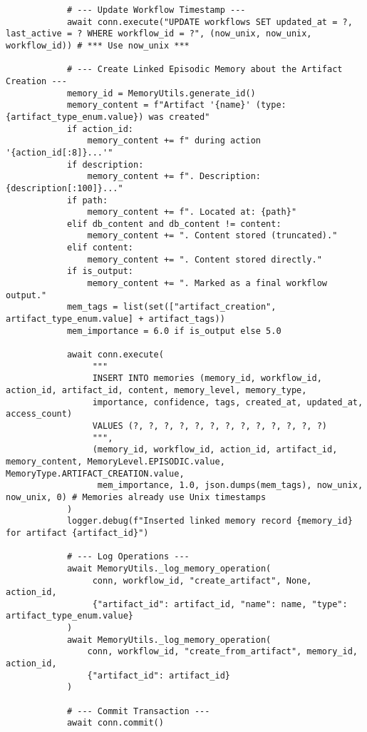 \documentclass[12pt,a4paper]{article}
\begin{document}
\begin{pageablecode}
\begin{verbatim}
            # --- Update Workflow Timestamp ---
            await conn.execute("UPDATE workflows SET updated_at = ?, last_active = ? WHERE workflow_id = ?", (now_unix, now_unix, workflow_id)) # *** Use now_unix ***

            # --- Create Linked Episodic Memory about the Artifact Creation ---
            memory_id = MemoryUtils.generate_id()
            memory_content = f"Artifact '{name}' (type: {artifact_type_enum.value}) was created"
            if action_id: 
                memory_content += f" during action '{action_id[:8]}...'"
            if description: 
                memory_content += f". Description: {description[:100]}..."
            if path: 
                memory_content += f". Located at: {path}"
            elif db_content and db_content != content: 
                memory_content += ". Content stored (truncated)."
            elif content: 
                memory_content += ". Content stored directly."
            if is_output: 
                memory_content += ". Marked as a final workflow output."
            mem_tags = list(set(["artifact_creation", artifact_type_enum.value] + artifact_tags))
            mem_importance = 6.0 if is_output else 5.0

            await conn.execute(
                 """
                 INSERT INTO memories (memory_id, workflow_id, action_id, artifact_id, content, memory_level, memory_type,
                 importance, confidence, tags, created_at, updated_at, access_count)
                 VALUES (?, ?, ?, ?, ?, ?, ?, ?, ?, ?, ?, ?, ?)
                 """,
                 (memory_id, workflow_id, action_id, artifact_id, memory_content, MemoryLevel.EPISODIC.value, MemoryType.ARTIFACT_CREATION.value,
                  mem_importance, 1.0, json.dumps(mem_tags), now_unix, now_unix, 0) # Memories already use Unix timestamps
            )
            logger.debug(f"Inserted linked memory record {memory_id} for artifact {artifact_id}")

            # --- Log Operations ---
            await MemoryUtils._log_memory_operation(
                 conn, workflow_id, "create_artifact", None, action_id,
                 {"artifact_id": artifact_id, "name": name, "type": artifact_type_enum.value}
            )
            await MemoryUtils._log_memory_operation(
                conn, workflow_id, "create_from_artifact", memory_id, action_id,
                {"artifact_id": artifact_id}
            )

            # --- Commit Transaction ---
            await conn.commit()


\end{verbatim}
\end{pageablecode}
\end{document}
